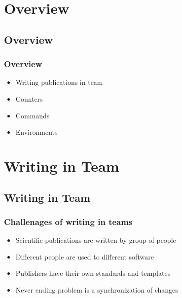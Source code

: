 \section[Overview]{Overview}
\subsection[Overview]{Overview}

\begin{frame}  \frametitle{Overview}
	\begin{itemize}
		\item Writing publications in team
		\item Counters
		\item Commands
		\item Environments
	\end{itemize}
\end{frame}

\section[Writing in Team]{Writing in Team}
\subsection[Writing in Team]{Writing in Team}

\begin{frame}  \frametitle{Challenages of writing in teams}

	\begin{itemize}	
		\item Scientific publications are written by group of people
		\item Different people are used to different software
		\item Publishers have their own standards and templates
		\item Never ending problem is a synchronization of changes
	\end{itemize}
\end{frame}



